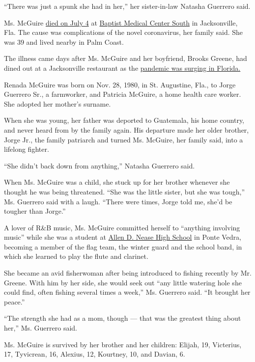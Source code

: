``There was just a spunk she had in her,'' her sister-in-law Natasha
Guerrero said.

Ms. McGuire
\href{https://www.firstcoastnews.com/article/news/local/st-augustine-mother-of-6-dies-from-covid-19/77-1572d6fb-5c26-472b-8264-8ba23cbcbcfa}{died
on July 4} at
\href{https://www.baptistjax.com/locations/baptist-medical-center-south}{Baptist
Medical Center South} in Jacksonville, Fla. The cause was complications
of the novel coronavirus, her family said. She was 39 and lived nearby
in Palm Coast.

The illness came days after Ms. McGuire and her boyfriend, Brooks
Greene, had dined out at a Jacksonville restaurant as the
\href{https://www.nytimes3xbfgragh.onion/2020/07/12/us/florida-coronavirus-covid-cases.html}{pandemic
was surging in Florida.}

Renada McGuire was born on Nov. 28, 1980, in St. Augustine, Fla., to
Jorge Guerrero Sr., a farmworker, and Patricia McGuire, a home health
care worker. She adopted her mother's surname.

When she was young, her father was deported to Guatemala, his home
country, and never heard from by the family again. His departure made
her older brother, Jorge Jr., the family patriarch and turned Ms.
McGuire, her family said, into a lifelong fighter.

``She didn't back down from anything,'' Natasha Guerrero said.

When Ms. McGuire was a child, she stuck up for her brother whenever she
thought he was being threatened. ``She was the little sister, but she
was tough,'' Ms. Guerrero said with a laugh. ``There were times, Jorge
told me, she'd be tougher than Jorge.''

A lover of R\&B music, Ms. McGuire committed herself to ``anything
involving music'' while she was a student at
\href{https://www-nhs.stjohns.k12.fl.us/}{Allen D. Nease High School} in
Ponte Vedra, becoming a member of the flag team, the winter guard and
the school band, in which she learned to play the flute and clarinet.

She became an avid fisherwoman after being introduced to fishing
recently by Mr. Greene. With him by her side, she would seek out ``any
little watering hole she could find, often fishing several times a
week,'' Ms. Guerrero said. ``It brought her peace.''

``The strength she had as a mom, though --- that was the greatest thing
about her,'' Ms. Guerrero said.

Ms. McGuire is survived by her brother and her children: Elijah, 19,
Victerius, 17, Tyvicrean, 16, Alexius, 12, Kourtney, 10, and Davian, 6.

